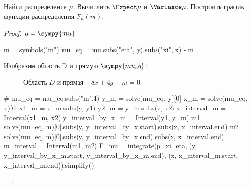 \begin{problem}
Найти распределение $\mu $. Вычислить $\Expect \mu$ и $\Variance\mu$.
Построить график функции распределения $F_\mu(m).$
\end{problem}

\begin{proof}
    $\mu= \sympy{mu}$

    \begin{sympycode}
m = symbols("m")
mu_eq = mu.subs("eta", y).subs("xi", x) - m
\end{sympycode}

    Изобразим область D и прямую  $\sympy{mu_eq}$:
    \begin{figure}[h!]
        \centering
        \caption{Область $D$ и прямая $-8x + 4y - m = 0$}
        \label{fig:D_m}
    \end{figure}

\begin{sympycode}
# mu_eq = mu_eq.subs("m",4)
y_m = solve(mu_eq, y)[0]
x_m = solve(mu_eq, x)[0]
x1_m = x_m.subs(y, y1)
y2_m = y_m.subs(x, x2)
x_interval_m = Interval(x1_m, x2)
y_interval_by_x_m = Interval(y1, y_m)
m1 = solve(mu_eq, m)[0].subs(y, y_interval_by_x.start).subs(x, x_interval.end)
m2 = solve(mu_eq, m)[0].subs(y, y_interval_by_x.end).subs(x, x_interval.end)
m_interval = Interval(m1, m2)
F_mu = integrate(p_xi_eta,  (y, y_interval_by_x_m.start, y_interval_by_x_m.end), 
                            (x, x_interval_m.start, x_interval_m.end)).simplify()
    \end{sympycode}
        

\end{proof}
